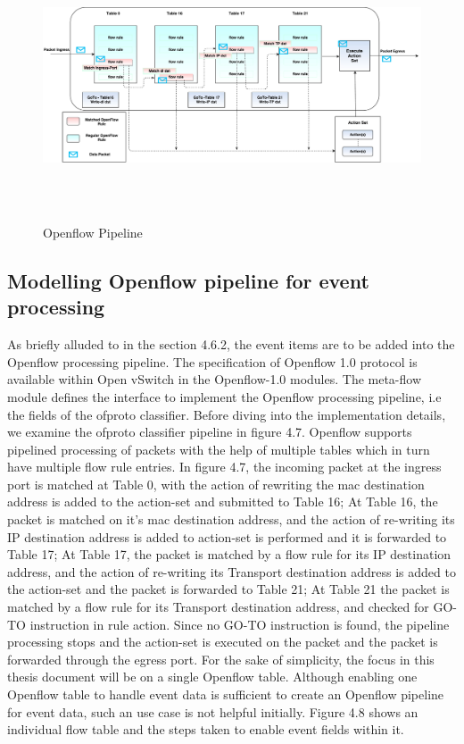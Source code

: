 \begin{figure}[H]
	\centering
	\caption{Openflow Pipeline}
	\includegraphics[height=8cm,width=19cm]{pipeline05.pdf}
\end{figure}

\subsection{Modelling Openflow pipeline for event processing}
As briefly alluded to in the section 4.6.2, the event items are to be added into the Openflow processing pipeline. The specification of Openflow 1.0 protocol is available within Open vSwitch in the Openflow-1.0 modules. The meta-flow module defines the interface to implement the Openflow processing pipeline, i.e the fields of the ofproto classifier. Before diving into the implementation details, we examine the ofproto classifier pipeline in figure 4.7. Openflow supports pipelined processing of packets with the help of multiple tables which in turn have multiple flow rule entries. In figure 4.7, the incoming packet at the ingress port is matched at Table 0, with the action of rewriting the mac destination address is added to the action-set and submitted to Table 16; At Table 16, the packet is matched on it's mac destination address, and the action of re-writing its IP destination address is added to action-set is performed and it is forwarded to Table 17; At Table 17, the packet is matched by a flow rule for its IP destination address, and the action of re-writing its Transport destination address is added to the action-set and the packet is forwarded to Table 21; At Table 21 the packet is matched by a flow rule for its Transport destination address, and checked for GO-TO instruction in rule action. Since no GO-TO instruction is found, the pipeline processing stops and the action-set is executed on the packet and the packet is forwarded through the egress port. For the sake of simplicity, the focus in this thesis document will be on a single Openflow table. Although enabling one Openflow table to handle event data is sufficient to create an Openflow pipeline for event data, such an use case is not helpful initially. Figure 4.8 shows an individual flow table and the steps taken to enable event fields within it. 

